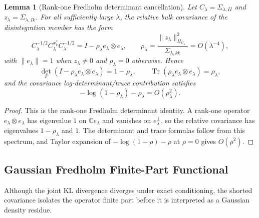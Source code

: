 \documentclass[preprint,12pt]{elsarticle}
\theoremstyle{plain}
\newtheorem{lemma}[theorem]{Lemma}
\theoremstyle{definition}
\theoremstyle{remark}
\newcommand{\tr}{\operatorname{Tr}}
\begin{document}
    \begin{lemma}[Rank-one Fredholm determinant cancellation]
        \label{lem:rank_one_fredholm_cancellation}
        Let $C_\lambda=\Sigma_{\lambda,II}$ and
        $z_\lambda=\Sigma_{\lambda,Ik}$.  For all sufficiently large $\lambda$,
        the relative bulk covariance of the disintegration member has the form
        \begin{equation}
            C_\lambda^{-1/2}C_\lambda^{x_k^*}C_\lambda^{-1/2}
            =
            I-\rho_\lambda e_\lambda\otimes e_\lambda,
            \qquad
            \rho_\lambda
            =
            \frac{\|z_\lambda\|_{H_{C_\lambda}}^2}
                 {\Sigma_{\lambda,kk}}
            =
            O(\lambda^{-4}),
        \end{equation}
        with $\|e_\lambda\|=1$ when $z_\lambda\ne0$ and $\rho_\lambda=0$
        otherwise.  Hence
        \begin{equation}
            \det_{\!F}(I-\rho_\lambda e_\lambda\otimes e_\lambda)
            =
            1-\rho_\lambda,
            \qquad
            \tr(\rho_\lambda e_\lambda\otimes e_\lambda)
            =
            \rho_\lambda,
        \end{equation}
        and the covariance log-determinant/trace contribution satisfies
        \begin{equation}
            -\log(1-\rho_\lambda)-\rho_\lambda
            =
            O(\rho_\lambda^2).
        \end{equation}
    \end{lemma}
    \begin{proof}
        This is the rank-one Fredholm determinant identity.  A rank-one
        operator $e_\lambda\otimes e_\lambda$ has eigenvalue $1$ on
        $\mathbb{C}e_\lambda$ and vanishes on $e_\lambda^\perp$, so the relative
        covariance has eigenvalues $1-\rho_\lambda$ and $1$.  The determinant
        and trace formulas follow from this spectrum, and Taylor expansion of
        $-\log(1-\rho)-\rho$ at $\rho=0$ gives $O(\rho^2)$.
    \end{proof}

    \subsection{Gaussian Fredholm Finite-Part Functional}
    \label{sec:gaussian:functional}

    Although the joint KL divergence diverges under exact conditioning, the
    shorted covariance isolates the operator finite part before it is interpreted
    as a Gaussian density residue.
\end{document}
